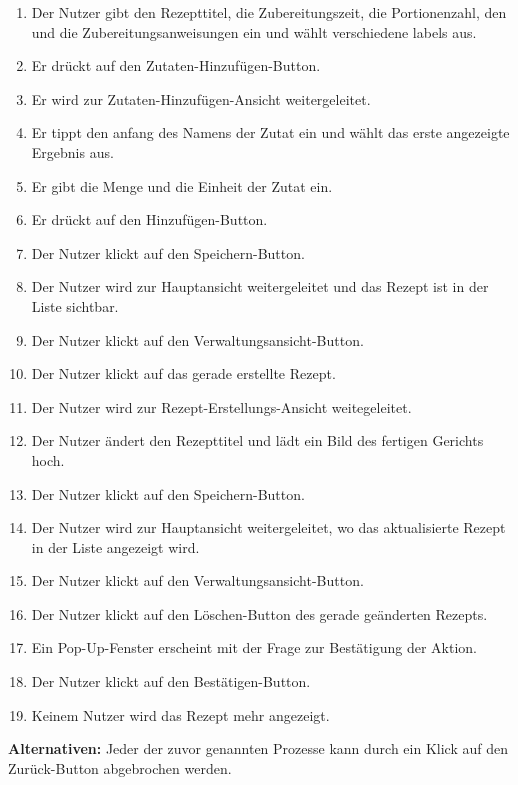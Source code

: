 \documentclass[parskip=full]{scrartcl}
\begin{document}
\begin{enumerate}
    \item Der Nutzer gibt den Rezepttitel, die Zubereitungszeit, die Portionenzahl, den  und die Zubereitungsanweisungen ein und wählt verschiedene \gls{labels} aus.
    \item Er drückt auf den Zutaten-Hinzufügen-Button.
    \item Er wird zur Zutaten-Hinzufügen-Ansicht weitergeleitet.
    \item Er tippt den anfang des Namens der Zutat ein und wählt das erste angezeigte Ergebnis aus.
    \item Er gibt die Menge und die Einheit der Zutat ein.
    \item Er drückt auf den Hinzufügen-Button.
    \item Der Nutzer klickt auf den Speichern-Button.
    \item Der Nutzer wird zur Hauptansicht weitergeleitet und das Rezept ist in der Liste sichtbar.
    \item Der Nutzer klickt auf den Verwaltungsansicht-Button.
    \item Der Nutzer klickt auf das gerade erstellte Rezept.
    \item Der Nutzer wird zur Rezept-Erstellungs-Ansicht weitegeleitet.
    \item Der Nutzer ändert den Rezepttitel und lädt ein Bild des fertigen Gerichts hoch.
    \item Der Nutzer klickt auf den Speichern-Button.
    \item Der Nutzer wird zur Hauptansicht weitergeleitet, wo das aktualisierte Rezept in der Liste angezeigt wird.
    \item Der Nutzer klickt auf den Verwaltungsansicht-Button.
    \item Der Nutzer klickt auf den Löschen-Button des gerade geänderten Rezepts.
    \item Ein Pop-Up-Fenster erscheint mit der Frage zur Bestätigung der Aktion.
    \item Der Nutzer klickt auf den Bestätigen-Button.
    \item Keinem Nutzer wird das Rezept mehr angezeigt.
\end{enumerate}
\textbf{Alternativen:} Jeder der zuvor genannten Prozesse kann durch ein Klick auf den Zurück-Button abgebrochen werden.
\newpage
\end{document}
